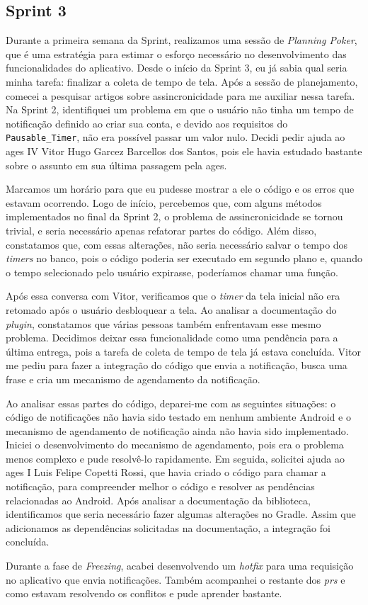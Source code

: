 \subsection{Sprint 3}

Durante a primeira semana da Sprint, realizamos uma sessão de \textit{Planning Poker}, que é uma estratégia para estimar o esforço necessário no desenvolvimento das funcionalidades do aplicativo. Desde o início da Sprint 3, eu já sabia qual seria minha tarefa: finalizar a coleta de tempo de tela. Após a sessão de planejamento, comecei a pesquisar artigos sobre assincronicidade para me auxiliar nessa tarefa. Na Sprint 2, identifiquei um problema em que o usuário não tinha um tempo de notificação definido ao criar sua conta, e devido aos requisitos do \texttt{Pausable\_Timer}, não era possível passar um valor nulo. Decidi pedir ajuda ao \ac{ages} IV Vitor Hugo Garcez Barcellos dos Santos, pois ele havia estudado bastante sobre o assunto em sua última passagem pela \ac{ages}.

Marcamos um horário para que eu pudesse mostrar a ele o código e os erros que estavam ocorrendo. Logo de início, percebemos que, com alguns métodos implementados no final da Sprint 2, o problema de assincronicidade se tornou trivial, e seria necessário apenas refatorar partes do código. Além disso, constatamos que, com essas alterações, não seria necessário salvar o tempo dos \textit{timers} no banco, pois o código poderia ser executado em segundo plano e, quando o tempo selecionado pelo usuário expirasse, poderíamos chamar uma função.

Após essa conversa com Vitor, verificamos que o \textit{timer} da tela inicial não era retomado após o usuário desbloquear a tela. Ao analisar a documentação do \textit{plugin}, constatamos que várias pessoas também enfrentavam esse mesmo problema. Decidimos deixar essa funcionalidade como uma pendência para a última entrega, pois a tarefa de coleta de tempo de tela já estava concluída. Vitor me pediu para fazer a integração do código que envia a notificação, busca uma frase e cria um mecanismo de agendamento da notificação.

Ao analisar essas partes do código, deparei-me com as seguintes situações: o código de notificações não havia sido testado em nenhum ambiente Android e o mecanismo de agendamento de notificação ainda não havia sido implementado. Iniciei o desenvolvimento do mecanismo de agendamento, pois era o problema menos complexo e pude resolvê-lo rapidamente. Em seguida, solicitei ajuda ao \ac{ages} I Luis Felipe Copetti Rossi, que havia criado o código para chamar a notificação, para compreender melhor o código e resolver as pendências relacionadas ao Android. Após analisar a documentação da biblioteca, identificamos que seria necessário fazer algumas alterações no Gradle. Assim que adicionamos as dependências solicitadas na documentação, a integração foi concluída.

Durante a fase de \textit{Freezing}, acabei desenvolvendo um \textit{hotfix} para uma requisição no aplicativo que envia notificações. Também acompanhei o restante dos \textit{\acp{pr}} e como estavam resolvendo os conflitos e pude aprender bastante.